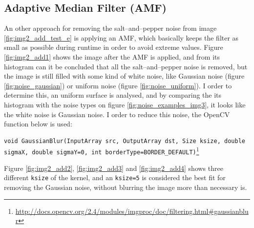 \subsection{Adaptive Median Filter (AMF)}
An other approach for removing the salt--and--pepper noise from image \ref{fig:img2_add_test_e} is applying an AMF, which basically keeps the filter as small as possible during runtime in order to avoid extreme values. Figure \ref{fig:img2_add1} shows the image after the AMF is applied, and from its histogram can it be concluded that all the salt--and--pepper noise is removed, but the image is still filled with some kind of white noise, like Gaussian noise (figure \ref{fig:noise_gaussian}) or uniform noise (figure \ref{fig:noise_uniform}). I order to determine this, an uniform surface is analysed, and by comparing the its histogram with the noise types on figure \ref{fig:noise_examples_img3}, it looks like the white noise is Gaussian noise. I order to reduce this noise, the OpenCV function below is used:
\begin{center}
	\lstinline|void GaussianBlur(InputArray src, OutputArray dst, Size ksize, double sigmaX, double sigmaY=0, int borderType=BORDER_DEFAULT)|\footnote{\url{http://docs.opencv.org/2.4/modules/imgproc/doc/filtering.html\#gaussianblur}}
\end{center}
Figure \ref{fig:img2_add2}, \ref{fig:img2_add3} and \ref{fig:img2_add4} shows three different \lstinline|ksize| of the kernel, and an \lstinline|ksize=5| is considered the best fit for removing the Gaussian noise, without blurring the image more than necessary is. 

